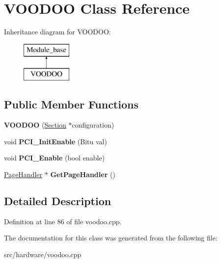 \hypertarget{classVOODOO}{\section{V\-O\-O\-D\-O\-O Class Reference}
\label{classVOODOO}
}
Inheritance diagram for V\-O\-O\-D\-O\-O\-:\begin{figure}[H]
\begin{center}
\leavevmode
\includegraphics[height=2.000000cm]{classVOODOO}
\end{center}
\end{figure}
\subsection*{Public Member Functions}
\begin{DoxyCompactItemize}
\item 
\hypertarget{classVOODOO_af87e97c8e7fede9c630ae0d27c99f3fb}{{\bfseries V\-O\-O\-D\-O\-O} (\hyperlink{classSection}{Section} $\ast$configuration)}\label{classVOODOO_af87e97c8e7fede9c630ae0d27c99f3fb}

\item 
\hypertarget{classVOODOO_a62a9a30d2ff3ae6afcd34602db0efc91}{void {\bfseries P\-C\-I\-\_\-\-Init\-Enable} (Bitu val)}\label{classVOODOO_a62a9a30d2ff3ae6afcd34602db0efc91}

\item 
\hypertarget{classVOODOO_a84607f3bebd1929e1d75c5c73b0a4c02}{void {\bfseries P\-C\-I\-\_\-\-Enable} (bool enable)}\label{classVOODOO_a84607f3bebd1929e1d75c5c73b0a4c02}

\item 
\hypertarget{classVOODOO_aae743d2b96dea4751ed89e288a4228bf}{\hyperlink{classPageHandler}{Page\-Handler} $\ast$ {\bfseries Get\-Page\-Handler} ()}\label{classVOODOO_aae743d2b96dea4751ed89e288a4228bf}

\end{DoxyCompactItemize}


\subsection{Detailed Description}


Definition at line 86 of file voodoo.\-cpp.



The documentation for this class was generated from the following file\-:\begin{DoxyCompactItemize}
\item 
src/hardware/voodoo.\-cpp\end{DoxyCompactItemize}
